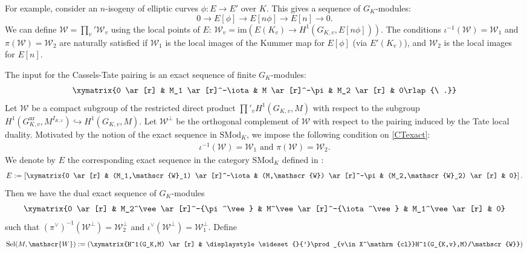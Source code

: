 \documentclass[a4paper]{amsart}
\theoremstyle{definition}
\numberwithin{equation}{section}
\begin{document}
For example, consider an $n$-isogeny of elliptic curves $\phi: E \to E'$ over $K$. This gives a sequence of $G_K$-modules:
$$0 \to E[\phi] \to E[n\phi] \to E[n] \to 0.$$
We can define $\mathscr{W}=\prod_v' \mathscr{W}_v$ using the local points of $E$:
$\mathscr{W}_v = \mathrm{im}(E(K_v) \to H^1(G_{K,v}, E[n\phi]))$. The conditions $\iota^{-1}(\mathscr{W}) = \mathscr{W}_1$ and $\pi(\mathscr{W}) = \mathscr{W}_2$ are naturally satisfied if $\mathscr{W}_1$ is the local images of the Kummer map for $E[\phi]$ (via $E'(K_v)$), and $\mathscr{W}_2$ is the local images for $E[n]$.



The input for the Cassels-Tate pairing is an exact sequence of finite $G_K$-modules:
    \begin{align}\label{CTexact}
    \xymatrix{0 \ar[r] & M_1 \ar[r]^-\iota & M \ar[r]^-\pi & M_2 \ar[r] & 0\rlap{\ .}}
    \end{align}
Let $\mathscr{W}$ be a compact subgroup of the restricted direct product $\prod'_v H^1(G_{K,v}, M)$ with respect to the subgroup $H^1(G_{K,v}^{\mathrm{nr}}, M^{I_{K,x}}) \hookrightarrow H^1(G_{K,v}, M)$.
 Let $\mathscr{W}^\perp$ be the orthogonal complement of $\mathscr{W}$ with respect to the pairing induced by the Tate local duality.
 Motivated by the notion of the exact sequence in $\mathrm{SMod}_K$, we impose the following condition on \eqref{CTexact}:
\begin{eqnarray}\label{SelmerM}
    \iota^{-1}(\mathscr{W}) =\mathscr{W}_1 \text{ and } \pi(\mathscr{W})=\mathscr{W}_2.
\end{eqnarray}
We denote by $E$ the corresponding exact sequence in the category $\mathrm{SMod}_K$ defined in \cite[section 2.2.1]{MS24}:
\begin{align}\label{Eexact}
    E:=\left[\xymatrix{0 \ar[r] & (M_1,\mathscr{W}_1) \ar[r]^-\iota & (M,\mathscr{W}) \ar[r]^-\pi & (M_2,\mathscr{W}_2) \ar[r] & 0}\right].
\end{align}
Then we have the dual exact sequence of $G_K$-modules
\begin{align*}
    \xymatrix{0 \ar[r] & M_2^\vee \ar[r]^-{\pi^\vee} & M^\vee \ar[r]^-{\iota^\vee} & M_1^\vee \ar[r] & 0}
\end{align*}
such that ${(\pi^\vee)}^{-1}(\mathscr{W}^\perp) = \mathscr{W}_2^{\perp}$ and $\iota^\vee (\mathscr{W}^\perp) = \mathscr{W}_1^\perp$.
Define
\begin{align*}
    \mathrm{Sel}(M,\mathscr{W}):=\left(\xymatrix{H^1(G_K,M) \ar[r] & \displaystyle\sideset{}{'}\prod_{v\in X^\mathrm{cl}}H^1(G_{K,v},M)/\mathscr{W}}\right)
\end{align*}
\end{document}
